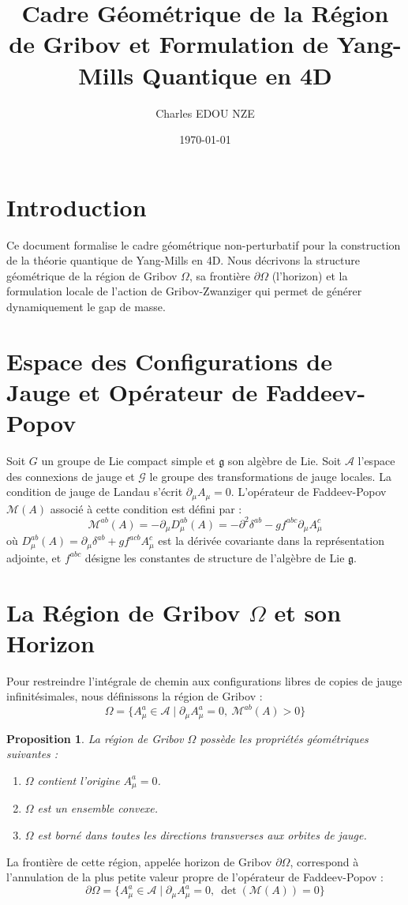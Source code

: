 \documentclass[11pt,a4paper]{article}
\title{Cadre Géométrique de la Région de Gribov et Formulation de Yang-Mills Quantique en 4D}
\author{Charles EDOU NZE}
\date{\today}
\newtheorem{proposition}[theorem]{Proposition}
\begin{document}
\maketitle


\section{Introduction}
Ce document formalise le cadre géométrique non-perturbatif pour la construction de la théorie quantique de Yang-Mills en 4D. Nous décrivons la structure géométrique de la région de Gribov $\Omega$, sa frontière $\partial \Omega$ (l'horizon) et la formulation locale de l'action de Gribov-Zwanziger qui permet de générer dynamiquement le gap de masse.

\section{Espace des Configurations de Jauge et Opérateur de Faddeev-Popov}
Soit $G$ un groupe de Lie compact simple et $\mathfrak{g}$ son algèbre de Lie.
Soit $\mathcal{A}$ l'espace des connexions de jauge et $\mathcal{G}$ le groupe des transformations de jauge locales.
La condition de jauge de Landau s'écrit $\partial_\mu A_\mu = 0$.
L'opérateur de Faddeev-Popov $\mathcal{M}(A)$ associé à cette condition est défini par :
$$ \mathcal{M}^{ab}(A) = -\partial_\mu D_\mu^{ab}(A) = -\partial^2 \delta^{ab} - g f^{abc} \partial_\mu A_\mu^c $$
où $D_\mu^{ab}(A) = \partial_\mu \delta^{ab} + g f^{acb} A_\mu^c$ est la dérivée covariante dans la représentation adjointe, et $f^{abc}$ désigne les constantes de structure de l'algèbre de Lie $\mathfrak{g}$.

\section{La Région de Gribov $\Omega$ et son Horizon}
Pour restreindre l'intégrale de chemin aux configurations libres de copies de jauge infinitésimales, nous définissons la région de Gribov :
$$ \Omega = \{ A_\mu^a \in \mathcal{A} \mid \partial_\mu A_\mu^a = 0, \ \mathcal{M}^{ab}(A) > 0 \} $$

\begin{proposition}
La région de Gribov $\Omega$ possède les propriétés géométriques suivantes :
\begin{enumerate}
    \item $\Omega$ contient l'origine $A_\mu^a = 0$.
    \item $\Omega$ est un ensemble convexe.
    \item $\Omega$ est borné dans toutes les directions transverses aux orbites de jauge.
\end{enumerate}
\end{proposition}
La frontière de cette région, appelée horizon de Gribov $\partial \Omega$, correspond à l'annulation de la plus petite valeur propre de l'opérateur de Faddeev-Popov :
$$ \partial \Omega = \{ A_\mu^a \in \mathcal{A} \mid \partial_\mu A_\mu^a = 0, \ \det(\mathcal{M}(A)) = 0 \} $$
\end{document}
